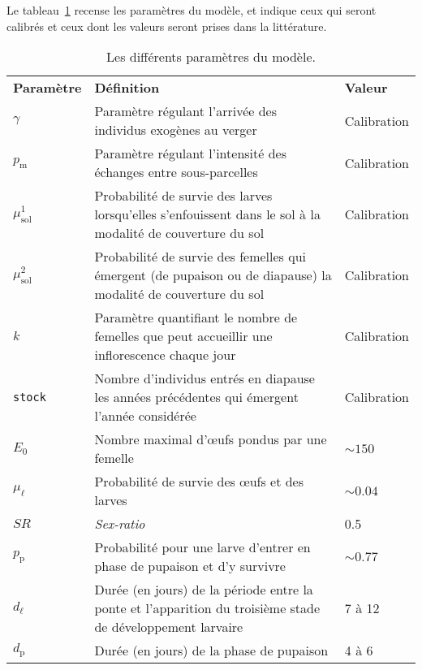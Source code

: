 Le tableau~\ref{tab:param} recense les paramètres du modèle, et indique ceux qui seront calibrés et ceux dont les valeurs seront prises dans la littérature.


    \clearpage%

    \begin{landscape}%
\begin{table}
\caption{Les différents paramètres du modèle.}
\label{tab:param}
\centering
{
\begin{tabular}{p{2cm}p{11.9cm}p{5cm}}
\textbf{Paramètre} & \textbf{Définition} & \textbf{Valeur}\\
$\gamma$ & Paramètre régulant l'arrivée des individus exogènes au verger & Calibration\\
$p_{\text{m}}$ & Paramètre régulant l'intensité des échanges entre sous-parcelles & Calibration\\
$\mu_{\text{sol}}^1$ & Probabilité de survie des larves lorsqu'elles s'enfouissent dans le sol à la modalité de couverture du sol & Calibration\\
$\mu_{\text{sol}}^2$ & Probabilité de survie des femelles qui émergent (de pupaison ou de diapause) la modalité de couverture du sol & Calibration\\
$k$ & Paramètre quantifiant le nombre de femelles que peut accueillir une inflorescence chaque jour & Calibration\\
\texttt{stock} & Nombre d'individus entrés en diapause les années précédentes qui émergent l'année considérée & Calibration  \\
$E_0$ & Nombre maximal d'œufs pondus par une femelle & $\sim\!150$ \citep{paul}\\
$\mu_{\ell}$ & Probabilité de survie des œufs et des larves & $\sim\!0.04$ \citep{paul}\\
$\mathit{SR}$ & \textit{Sex-ratio} & 0.5 \citep{paul}\\
$p_{\text{p}}$ & Probabilité pour une larve d'entrer en phase de pupaison et d'y survivre & $\sim\! 0.77$ \citep{pauldiap}\\
$d_{\ell}$ & Durée (en jours) de la période entre la ponte et l'apparition du troisième stade de développement larvaire & 7 à 12 \citep{paul} \\
$d_{\text{p}}$ & Durée (en jours) de la phase de pupaison & 4 à 6 \citep{paul}
\end{tabular}
}
\end{table}
    \end{landscape}

